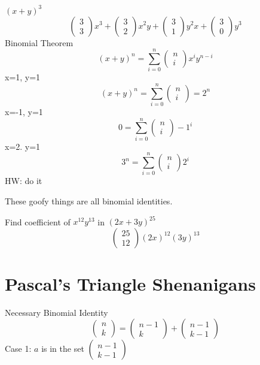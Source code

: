 \documentclass{report}
\begin{document}
$(x +y)^3$
\[
\begin{pmatrix} 3 \\ 3 \end{pmatrix} x^3 + 
\begin{pmatrix} 3 \\ 2 \end{pmatrix} x^2y + 
\begin{pmatrix} 3 \\ 1 \end{pmatrix}y^2x + 
\begin{pmatrix} 3 \\ 0 \end{pmatrix} y^3
\]
Binomial Theorem
\[
(x+y)^n = \sum^n_{i=0} \begin{pmatrix} n \\ i \end{pmatrix} x^iy^{n-i}
\]
x=1, y=1
\[
(x+y)^n =  \sum^n_{i=0} \begin{pmatrix} n \\ i \end{pmatrix} = 2^n
\]
x=-1, y=1
\[
0 =  \sum^n_{i=0} \begin{pmatrix} n \\ i \end{pmatrix} -1^i
\]
x=2. y=1
\[
3^n =  \sum^n_{i=0} \begin{pmatrix} n \\ i \end{pmatrix} 2^i
\]
HW: do it

These goofy things are all binomial identities.

Find coefficient of $x^{12}y^{13}$ in $(2x+3y)^{25}$
\[
\begin{pmatrix} 25 \\ 12 \end{pmatrix} (2x)^{12}(3y)^{13}
\]

\section{Pascal's Triangle Shenanigans}
Necessary Binomial Identity
\[
\begin{pmatrix} n \\ k \end{pmatrix}
=
\begin{pmatrix} n-1 \\ k \end{pmatrix}
+
\begin{pmatrix} n-1 \\ k-1 \end{pmatrix}
\]
Case 1: $a$ is in the set $\begin{pmatrix} n-1 \\ k-1 \end{pmatrix}$
\end{document}
